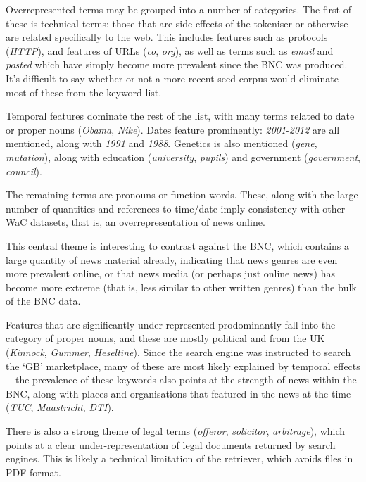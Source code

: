 Overrepresented terms may be grouped into a number of categories.  The first of these is technical terms: those that are side-effects of the tokeniser or otherwise are related specifically to the web.  This includes features such as protocols (\textsl{HTTP}), and features of URLs (\textsl{co}, \textsl{org}), as well as terms such as \textsl{email} and \textsl{posted} which have simply become more prevalent since the BNC was produced.  It's difficult to say whether or not a more recent seed corpus would eliminate most of these from the keyword list.

Temporal features dominate the rest of the list, with many terms related to date or proper nouns (\textsl{Obama}, \textsl{Nike}).  Dates feature prominently: \textsl{2001}-\textsl{2012} are all mentioned, along with \textsl{1991} and \textsl{1988}.  Genetics is also mentioned (\textsl{gene}, \textsl{mutation}), along with education (\textsl{university}, \textsl{pupils}) and government (\textsl{government}, \textsl{council}).

The remaining terms are pronouns or function words.  These, along with the large number of quantities and references to time/date imply consistency with other WaC datasets, that is, an overrepresentation of news online\cite{sridharan2012modeling}.

This central theme is interesting to contrast against the BNC, which contains a large quantity of news material already, indicating that news genres are even more prevalent online, or that news media (or perhaps just online news) has become more extreme (that is, less similar to other written genres) than the bulk of the BNC data.

Features that are significantly under-represented prodominantly fall into the category of proper nouns, and these are mostly political and from the UK (\textsl{Kinnock}, \textsl{Gummer}, \textsl{Heseltine}).  Since the search engine was instructed to search the `GB' marketplace, many of these are most likely explained by temporal effects---the prevalence of these keywords also points at the strength of news within the BNC, along with places and organisations that featured in the news at the time (\textsl{TUC}, \textsl{Maastricht}, \textsl{DTI}).

There is also a strong theme of legal terms (\textsl{offeror}, \textsl{solicitor}, \textsl{arbitrage}), which points at a clear under-representation of legal documents returned by search engines.  This is likely a technical limitation of the retriever, which avoids files in PDF format.

